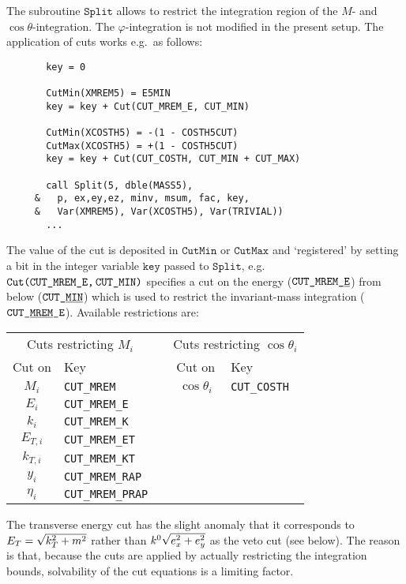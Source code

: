 \documentclass[twoside,11pt]{article}
\def\Code#1{\ensuremath{\texttt{#1}}}
\def\eg{e.g.\ }
\def\uscore{\symbol{95}}
\begin{document}
The subroutine \Code{Split} allows to restrict the integration region of 
the $M$- and $\cos\theta$-integration.  The $\varphi$-integration is not 
modified in the present setup.  The application of cuts works \eg as 
follows:
\begin{verbatim}
       key = 0

       CutMin(XMREM5) = E5MIN
       key = key + Cut(CUT_MREM_E, CUT_MIN)

       CutMin(XCOSTH5) = -(1 - COSTH5CUT)
       CutMax(XCOSTH5) = +(1 - COSTH5CUT)
       key = key + Cut(CUT_COSTH, CUT_MIN + CUT_MAX)

       call Split(5, dble(MASS5),
     &   p, ex,ey,ez, minv, msum, fac, key,
     &   Var(XMREM5), Var(XCOSTH5), Var(TRIVIAL))
       ...
\end{verbatim}
The value of the cut is deposited in \Code{CutMin} or \Code{CutMax} and 
`registered' by setting a bit in the integer variable \Code{key} passed 
to \Code{Split}, \eg \Code{Cut(CUT\uscore MREM\uscore E,\,CUT\uscore MIN)}
specifies a cut on the energy (\Code{CUT\uscore MREM\uscore\underline{E}})
from below (\Code{CUT\uscore\underline{MIN}}) which is used to restrict 
the invariant-mass integration (\Code{CUT\uscore\underline{MREM}\uscore E}).
Available restrictions are:
\begin{center}
\begin{tabular}{|c|l|l|c|l|}
\multicolumn{2}{c}{Cuts restricting $M_i$} &
\multicolumn{1}{c}{\qquad} &
\multicolumn{2}{c}{Cuts restricting $\cos\theta_i$} \\
\cline{1-2}\cline{4-5}
Cut on & Key & & Cut on & Key \\
\cline{1-2}\cline{4-5}
$M_i$     & \verb=CUT_MREM=      & & $\cos\theta_i$     & \verb=CUT_COSTH= \\
$E_i$     & \verb=CUT_MREM_E=    & &			& \\
$k_i$     & \verb=CUT_MREM_K=    & &			& \\
$E_{T,i}$ & \verb=CUT_MREM_ET=   & &			& \\
$k_{T,i}$ & \verb=CUT_MREM_KT=   & &			& \\
$y_i$     & \verb=CUT_MREM_RAP=  & &			& \\
$\eta_i$  & \verb=CUT_MREM_PRAP= & &			& \\
\cline{1-2}\cline{4-5}
\end{tabular}
\end{center}
The transverse energy cut has the slight anomaly that it corresponds to 
$E_T = \sqrt{\smash[b]{k_T^2} + m^2}$ rather than $k^0 
\sqrt{\smash[b]{e_x^2 + e_y^2}}$ as the veto cut (see below).  The 
reason is that, because the cuts are applied by actually restricting the 
integration bounds, solvability of the cut equations is a limiting 
factor.
\end{document}
